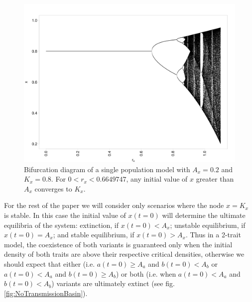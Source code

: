 \documentclass[review,authoryear]{elsarticle}
\begin{document}
\begin{figure}[h!]
  \centering
      \includegraphics[width=1\textwidth]{./figures/figure1.jpg}
  \caption{Bifurcation diagram of a single population model with $A_x=0.2$ and $K_x=0.8$. For $0<r_x<0.6649747$, any initial value of $x$ greater than $A_x$ converges to $K_x$.}
    \label{fig:bifurcationDiagram}
\end{figure}

For the rest of the paper we will consider only scenarios where the node $x=K_x$ is stable. In this case the initial value of $x(t=0)$ will determine the ultimate equilibria of the system: extinction, if $x(t=0)<A_x$; unstable equilibrium, if $x(t=0)=A_x$; and stable equilibrium, if $x(t=0)>A_x$. Thus in a 2-trait model, the coexistence of both variants is guaranteed only when the initial density of both traits are above their respective critical densities, otherwise we should expect that either (i.e. $a(t=0) \geq A_a$ and $b(t=0)<A_b$ or $a(t=0)<A_a$ and $b(t=0) \geq A_b$) or both (i.e. when $a(t=0)<A_a$ and $b(t=0)<A_b$) variants are ultimately extinct (see fig. \ref{fig:NoTransmissionBasin}). 
\end{document}
